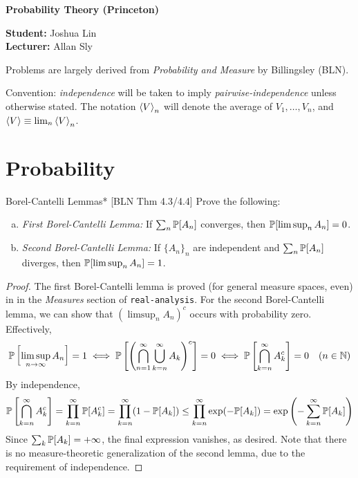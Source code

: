 





\begin{Large}
    \textsf{\textbf{Probability Theory (Princeton)}}
\end{Large}

\vspace{1ex}

\textsf{\textbf{Student:}} Joshua Lin \\
\textsf{\textbf{Lecturer:}} Allan Sly

\vspace{2ex}

Problems are largely derived from \emph{Probability and Measure} by Billingsley (BLN). 
\stdvspace

Convention: \emph{independence} will be taken to imply \emph{pairwise-independence} unless otherwise stated. The notation \(\ev{V}_n\) will denote the average of \(V_1, \dots, V_n\), and \(\ev{V} \equiv \lim_n \ev{V}_n\). 

\section{Probability}


\begin{problem}{Borel-Cantelli Lemmas}*
    [BLN Thm 4.3/4.4] Prove the following:
    \begin{enumerate}[(a)]
        \itemsep0em
        \item \emph{First Borel-Cantelli Lemma:} If \(\sum_n \mathbb{P}[A_n]\) converges, then \(\mathbb{P}[\limsup_n A_n] = 0\).
        \item \emph{Second Borel-Cantelli Lemma:} If \(\{A_n\}_n\) are independent and \(\sum_n \mathbb{P}[A_n]\) diverges, then \(\mathbb{P}[\limsup_n A_n] = 1\).
    \end{enumerate}
\end{problem}


\begin{proof}
    The first Borel-Cantelli lemma is proved (for general measure spaces, even) in in the \emph{Measures} section of \texttt{real-analysis}. For the second Borel-Cantelli lemma, we can show that \((\limsup_n A_n)^c\) occurs with probability zero. Effectively,
    \[
        \mathbb{P}\left[\limsup_{n \to \infty} A_n\right] = 1
        \iff \mathbb{P}\left[ \left(\bigcap_{n=1}^\infty \bigcup_{k=n}^\infty A_k\right)^c \right] = 0
        \iff \mathbb{P}\left[ \bigcap_{k=n}^\infty A_k^c \right] = 0
        \quad (n \in \mathbb{N})
    \]
    By independence,
    \[
        \mathbb{P}\left[ \bigcap_{k =n}^\infty A_k^c \right]
        = \prod_{k=n}^\infty \mathbb{P}[A_k^c]
        = \prod_{k=n}^\infty (1 - \mathbb{P}[A_k])
        \leq \prod_{k=n}^\infty \exp(-\mathbb{P}[A_k])
        = \exp\left( -\sum_{k=n}^\infty \mathbb{P}[A_k] \right)
    \]
    Since \(\sum_k \mathbb{P}[A_k] = +\infty\), the final expression vanishes, as desired. Note that there is no measure-theoretic generalization of the second lemma, due to the requirement of independence.
\end{proof}


